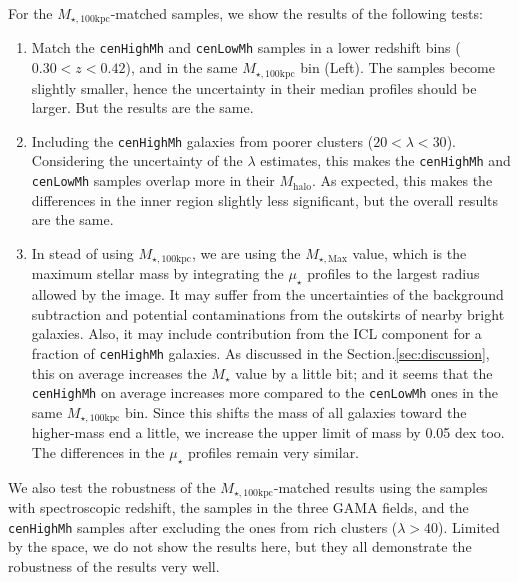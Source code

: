 \documentclass{emulateapj}
\def\rbcg{\texttt{cenHighMh}}
\def\nbcg{\texttt{cenLowMh}}
\def\mstar{{$M_{\star}$}}
\def\mhalo{{$M_{\mathrm{halo}}$}}
\def\mtot{{$M_{\star,100\mathrm{kpc}}$}}
\def\mmax{{$M_{\star,\mathrm{Max}}$}}
\def\mden{{$\mu_{\star}$}}
\newcommand{\update}[1]{\textcolor{Bittersweet}{#1}}
\begin{document}
\begin{CJK*}{UTF8}{gbsn}
    \update{
    For the \mtot{}-matched samples, we show the results of the following tests: 
    }
    
    \begin{enumerate}
        \item \update{
            Match the \rbcg{} and \nbcg{} samples in a lower redshift bins 
            ($0.30 < z < 0.42$), and in the same \mtot{} bin (Left). 
            The samples become slightly smaller, hence the uncertainty in their 
            median profiles should be larger.  But the results are the same.
            }
        \item \update{
            Including the \rbcg{} galaxies from poorer clusters ($20 < \lambda < 30$).
            Considering the uncertainty of the $\lambda$ estimates, this makes the 
            \rbcg{} and \nbcg{} samples overlap more in their \mhalo{}.  
            As expected, this makes the differences in the inner region slightly less
            significant, but the overall results are the same. 
            } 
        \item \update{
            In stead of using \mtot{}, we are using the \mmax{} value, which is the 
            maximum stellar mass by integrating the \mden{} profiles to the largest 
            radius allowed by the image.  
            It may suffer from the uncertainties of the background subtraction and 
            potential contaminations from the outskirts of nearby bright galaxies. 
            Also, it may include contribution from the ICL component for a fraction 
            of \rbcg{} galaxies. 
            As discussed in the Section.\ref{sec:discussion}, this on average increases 
            the \mstar{} value by a little bit; and it seems that the \rbcg{} on average
            increases more compared to the \nbcg{} ones in the same \mtot{} bin. 
            Since this shifts the mass of all galaxies toward the higher-mass end a 
            little, we increase the upper limit of mass by 0.05 dex too. 
            The differences in the \mden{} profiles remain very similar.
            }
    \end{enumerate}
    
    \update{
    We also test the robustness of the \mtot{}-matched results using the samples with 
    spectroscopic redshift, the samples in the three GAMA fields, and the \rbcg{} samples 
    after excluding the ones from rich clusters ($\lambda > 40$).  
    Limited by the space, we do not show the results here, but they all demonstrate the 
    robustness of the results very well. 
    }
    

\end{CJK*}
\end{document}
